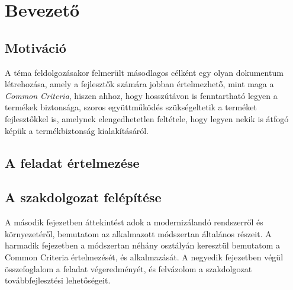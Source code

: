 \chapter{Bevezető}


\section{Motiváció}

A téma feldolgozásakor felmerült másodlagos célként egy olyan dokumentum létrehozása, amely
a fejlesztők számára jobban értelmezhető, mint maga a \emph{Common Criteria}, hiszen ahhoz, hogy
hosszútávon is fenntartható legyen a termékek biztonsága, szoros együttműködés szükségeltetik
a terméket fejlesztőkkel is, amelynek elengedhetetlen feltétele, hogy legyen nekik is átfogó képük
a termékbiztonság kialakításáról.

\section{A feladat értelmezése}

\section{A szakdolgozat felépítése}
A második fejezetben áttekintést adok a modernizálandó rendszerről és környezetéről, bemutatom az
alkalmazott módszertan általános részeit. A harmadik fejezetben a módszertan néhány osztályán
keresztül bemutatom a Common Criteria értelmezését, és alkalmazását.
A negyedik fejezetben végül összefoglalom a feladat végeredményét, és felvázolom a szakdolgozat
továbbfejlesztési lehetőségeit.

